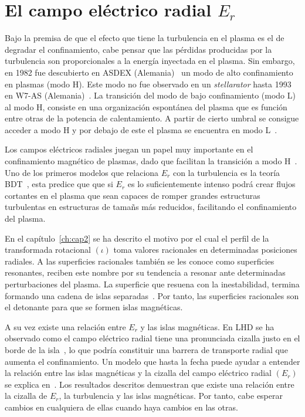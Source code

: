 \section{El campo eléctrico radial \texorpdfstring{$E_r$}{Er}}
Bajo la premisa de que el efecto que tiene la turbulencia en el plasma es el de degradar
el confinamiento, cabe pensar que las pérdidas producidas por la turbulencia son proporcionales
a la energía inyectada en el plasma. Sin embargo, en 1982 fue descubierto en ASDEX
(Alemania)~\cite{PhysRevLett.49.1408} un modo de alto confinamiento en plasmas (modo H). Este modo no fue
observado en un \textit{stellarator} hasta 1993 en W7-AS (Alemania)~\cite{PhysRevLett.70.2086}.
La transición del modo de bajo confinamiento (modo L) al modo H, consiste en una organización 
espontánea del plasma que es función entre otras de la potencia de calentamiento.
A partir de cierto umbral se consigue acceder a modo H y por debajo de este el plasma se
encuentra en modo L~\cite{Ryter_1998}.\par
Los campos eléctricos radiales juegan un papel muy importante en el confinamiento magnético
de plasmas, dado que facilitan la transición a modo H~\cite{PhysRevLett.107.245004,Itoh_1989}. 
Uno de los primeros modelos
que relaciona $E_r$ con la turbulencia es la teoría BDT~\cite{doi:10.1063/1.859529}, 
esta predice que que si $E_r$ es lo
suficientemente intenso podrá crear flujos cortantes en el plasma que sean capaces de romper
grandes estructuras turbulentas en estructuras de tamañs más reducidos, 
facilitando el confinamiento del plasma.\par
En el capítulo~\ref{ch:cap2} se ha descrito el motivo por el cual el perfil de la transformada rotacional
$(\iota)$ toma valores racionales en determinadas posiciones radiales. A las superficies racionales
también se les conoce como superficies resonantes, reciben este nombre por su
tendencia a resonar ante determinadas perturbaciones del plasma. La superficie que resuena
con la inestabilidad, termina formando una cadena de islas separadas~\cite{doi:10.1063/1.1706761}. 
Por tanto, las superficies racionales son el detonante para que se formen islas magnéticas.\par
A su vez existe una relación entre $E_r$ y las islas magnéticas. En LHD se ha observado como
el campo eléctrico radial tiene una pronunciada cizalla justo en el borde de la isla~\cite{Ida_2004}, lo que
podría constituir una barrera de transporte radial que aumenta el confinamiento. 
Un modelo que hasta la fecha puede ayudar a entender la relación
entre las islas magnéticas y la cizalla del campo eléctrico radial $(E_r)$ se explica en~\cite{doi:10.1063/1.1491533}.
Los resultados descritos demuestran que existe una relación entre la cizalla de $E_r$, la turbulencia
y las islas magnéticas. Por tanto, cabe esperar cambios en cualquiera de ellas cuando haya cambios en las otras.
